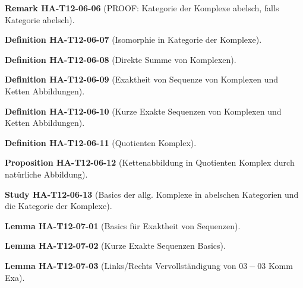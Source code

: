 \documentclass[10pt, letterpaper]{article}
\newcommand{\CustomHeading}[3]{%
  \par\medskip\noindent%
  \textbf{#1 #2} \textnormal{(#3)}.\enskip%
}
\newenvironment{DEF}[2]{\CustomHeading{Definition}{#1}{#2}}{}
\newenvironment{PROP}[2]{\CustomHeading{Proposition}{#1}{#2}}{}
\newenvironment{LEM}[2]{\CustomHeading{Lemma}{#1}{#2}}{}
\newenvironment{REM}[2]{\CustomHeading{Remark}{#1}{#2}}{}
\newenvironment{STUD}[2]{\CustomHeading{Study}{#1}{#2}}{}
\begin{document}
\begin{REM}{HA-T12-06-06}{PROOF: Kategorie der Komplexe abelsch, falls Kategorie abelsch}
\end{REM}

\begin{DEF}{HA-T12-06-07}{Isomorphie in Kategorie der Komplexe}
\end{DEF}

\begin{DEF}{HA-T12-06-08}{Direkte Summe von Komplexen}
\end{DEF}

\begin{DEF}{HA-T12-06-09}{Exaktheit von Sequenze von Komplexen und Ketten Abbildungen}
\end{DEF}

\begin{DEF}{HA-T12-06-10}{Kurze Exakte Sequenzen von Komplexen und Ketten Abbildungen}
\end{DEF}

\begin{DEF}{HA-T12-06-11}{Quotienten Komplex}
\end{DEF}

\begin{PROP}{HA-T12-06-12}{Kettenabbildung in Quotienten Komplex durch natürliche Abbildung}
\end{PROP}

\begin{STUD}{HA-T12-06-13}{Basics der allg. Komplexe in abelschen Kategorien und die Kategorie der Komplexe}
\end{STUD}

\begin{LEM}{HA-T12-07-01}{Basics für Exaktheit von Sequenzen}
\end{LEM}

\begin{LEM}{HA-T12-07-02}{Kurze Exakte Sequenzen Basics}
\end{LEM}

\begin{LEM}{HA-T12-07-03}{Links/Rechts Vervollständigung von $03-03$ Komm Exa}
\end{LEM}
\end{document}
